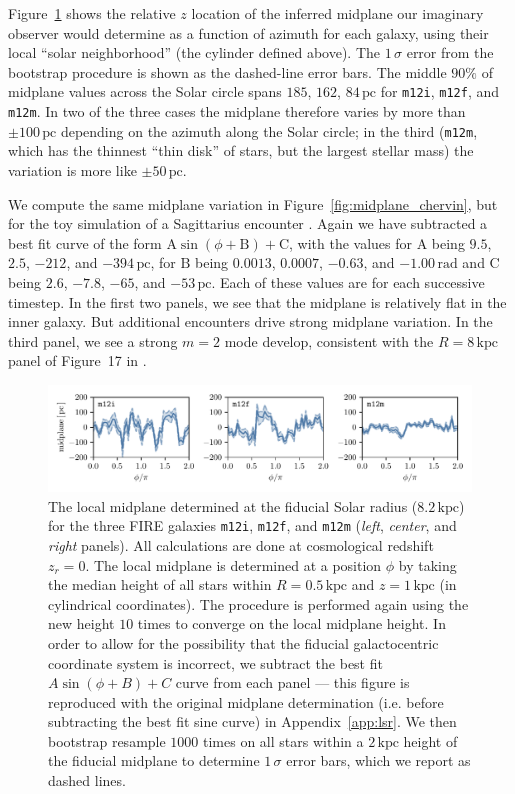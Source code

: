 \documentclass[twocolumn]{aastex62}
\newcommand{\pc}{\text{pc}}
\newcommand{\kpc}{\text{kpc}}
\newcommand{\mi}{\texttt{m12i}}
\newcommand{\mf}{\texttt{m12f}}
\newcommand{\mm}{\texttt{m12m}}
\newcommand{\z}{z_r}
\begin{document}
Figure~\ref{fig:midplane} shows the relative $z$ location of the inferred
midplane our imaginary observer would determine as a function of azimuth for
each galaxy, using their local ``solar neighborhood'' (the cylinder defined
above). The $1\,\sigma$ error from the bootstrap procedure is shown as the
dashed-line error bars. The middle $90\%$ of midplane values across the Solar
circle spans $185$, $162$, $84\,\pc$ for \mi{}, \mf{}, and \mm{}. In two of
the three cases the midplane therefore varies by more than $\pm 100\,\pc$
depending on the azimuth along the Solar circle; in the third (\mm{}, which
has the thinnest ``thin disk'' of stars, but the largest stellar mass) the
variation is more like $\pm 50\,\pc$.

We compute the same midplane variation in Figure~\ref{fig:midplane_chervin},
but for the toy simulation of a Sagittarius encounter
\citep{2018MNRAS.481..286L}. Again we have subtracted a best fit curve of the
form $\text{A} \sin{\left(\phi + \text{B}\right)} + \text{C}$, with the values
for $\text{A}$ being $9.5$, $2.5$, $-212$, and $-394\,\pc$, for $\text{B}$ being
$0.0013$, $0.0007$, $-0.63$, and $-1.00\,\text{rad}$ and $\text{C}$ being $2.6$, $-7.8$,
$-65$, and $-53\,\pc$. Each of these values are for each successive timestep. In the
first two panels, we see that the midplane is relatively flat in the inner
galaxy. But additional encounters drive strong midplane variation. In the
third panel, we see a strong $m=2$ mode develop, consistent with the
$R=8\,\kpc$ panel of Figure~17 in \citet{2018MNRAS.481..286L}.

\begin{figure}
\begin{center}
\includegraphics[width=\textwidth]{fig/midplane_fit.pdf}
\end{center}
\caption{The local midplane determined at the fiducial Solar radius
($8.2\,\kpc$) for the three FIRE galaxies \mi{}, \mf{}, and \mm{} ({\em left},
{\em center}, and {\em right} panels). All calculations are done at cosmological redshift $\z =0$. The local midplane is determined at a
position $\phi$ by taking the median height of all stars within $R=0.5\,\kpc$
and $z=1\,\kpc$ (in cylindrical coordinates). The procedure is performed again
using the new height $10$ times to converge on the local midplane height. In
order to allow for the possibility that the fiducial galactocentric coordinate
system is incorrect, we subtract the best fit $A\sin{(\phi+B)}+C$ curve from
each panel --- this figure is reproduced with the original midplane
determination (i.e. before subtracting the best fit sine curve) in
Appendix~\ref{app:lsr}. We then bootstrap resample $1000$ times on all stars
within a $2\,\kpc$ height of the fiducial midplane to determine $1\,\sigma
$ error bars, which we report as dashed lines.}
\label{fig:midplane}
\end{figure}
\end{document}
